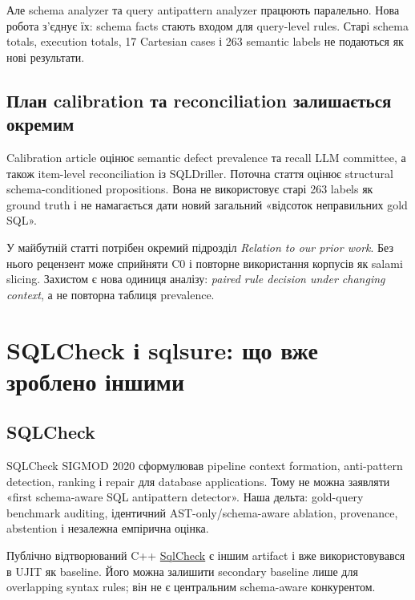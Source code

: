 \documentclass[11pt,a4paper]{article}
\begin{document}
Але schema analyzer та query antipattern analyzer працюють паралельно. Нова робота
з'єднує їх: schema facts стають входом для query-level rules. Старі schema totals,
execution totals, 17 Cartesian cases і 263 semantic labels не подаються як нові
результати.

\subsection{План calibration та reconciliation залишається окремим}

Calibration article оцінює semantic defect prevalence та recall LLM committee, а також
item-level reconciliation із SQLDriller. Поточна стаття оцінює structural
schema-conditioned propositions. Вона не використовує старі 263 labels як ground
truth і не намагається дати новий загальний «відсоток неправильних gold SQL».

\begin{warningbox}
У майбутній статті потрібен окремий підрозділ \emph{Relation to our prior work}.
Без нього рецензент може сприйняти C0 і повторне використання корпусів як salami
slicing. Захистом є нова одиниця аналізу: \emph{paired rule decision under changing
context}, а не повторна таблиця prevalence.
\end{warningbox}

\section{SQLCheck і sqlsure: що вже зроблено іншими}

\subsection{SQLCheck}

SQLCheck SIGMOD 2020 сформулював pipeline context formation, anti-pattern detection,
ranking і repair для database applications. Тому не можна заявляти «first
schema-aware SQL antipattern detector». Наша дельта: gold-query benchmark auditing,
ідентичний AST-only/schema-aware ablation, provenance, abstention і незалежна
емпірична оцінка.

Публічно відтворюваний C++ \href{https://github.com/jarulraj/sqlcheck}{SqlCheck}
є іншим artifact і вже використовувався в UJIT як baseline. Його можна залишити
secondary baseline лише для overlapping syntax rules; він не є центральним
schema-aware конкурентом.
\end{document}
